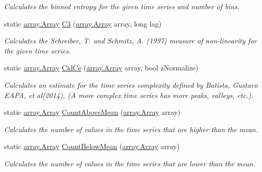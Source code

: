 \begin{DoxyCompactItemize}
\begin{DoxyCompactList}\small\item\em Calculates the binned entropy for the given time series and number of bins. \end{DoxyCompactList}\item 
static \mbox{\hyperlink{classkhiva_1_1array_1_1_array}{array.\+Array}} \mbox{\hyperlink{classkhiva_1_1features_1_1_features_a462639f20b7a0c7cac1522cbaa0d2122}{C3}} (\mbox{\hyperlink{classkhiva_1_1array_1_1_array}{array.\+Array}} array, long lag)
\begin{DoxyCompactList}\small\item\em Calculates the Schreiber, T. and Schmitz, A. (1997) measure of non-\/linearity for the given time series. \end{DoxyCompactList}\item 
static \mbox{\hyperlink{classkhiva_1_1array_1_1_array}{array.\+Array}} \mbox{\hyperlink{classkhiva_1_1features_1_1_features_a06e07fc2169ecd94fbf7f21b407a683d}{Cid\+Ce}} (\mbox{\hyperlink{classkhiva_1_1array_1_1_array}{array.\+Array}} array, bool z\+Normalize)
\begin{DoxyCompactList}\small\item\em Calculates an estimate for the time series complexity defined by Batista, Gustavo E\+A\+PA, et al(2014). (A more complex time series has more peaks, valleys, etc.). \end{DoxyCompactList}\item 
static \mbox{\hyperlink{classkhiva_1_1array_1_1_array}{array.\+Array}} \mbox{\hyperlink{classkhiva_1_1features_1_1_features_aebdccf7a2d77f12e1b8869e24369d231}{Count\+Above\+Mean}} (\mbox{\hyperlink{classkhiva_1_1array_1_1_array}{array.\+Array}} array)
\begin{DoxyCompactList}\small\item\em Calculates the number of values in the time series that are higher than the mean. \end{DoxyCompactList}\item 
static \mbox{\hyperlink{classkhiva_1_1array_1_1_array}{array.\+Array}} \mbox{\hyperlink{classkhiva_1_1features_1_1_features_a3b5f991bd9bf561b338f107a594775fd}{Count\+Below\+Mean}} (\mbox{\hyperlink{classkhiva_1_1array_1_1_array}{array.\+Array}} array)
\begin{DoxyCompactList}\small\item\em Calculates the number of values in the time series that are lower than the mean. \end{DoxyCompactList}\item 

\end{DoxyCompactItemize}
